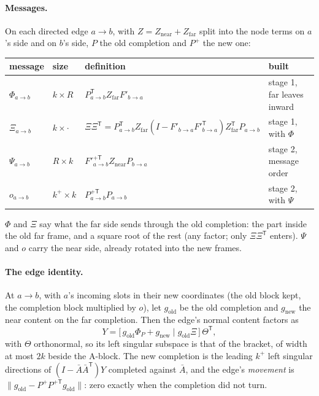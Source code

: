 \documentclass[11pt]{article}
\newcommand{\T}{\mathsf{T}}
\newcommand{\Abar}{\bar A}
\theoremstyle{definition}
\theoremstyle{plain}
\begin{document}
\paragraph{Messages.} On each directed edge $a\to b$, with $Z=Z_{\mathrm{near}}+Z_{\mathrm{far}}$ split into the
node terms on $a$'s side and on $b$'s side, $P$ the old completion and $P^+$ the new one:
\begin{center}
\begin{tabular}{@{}llll@{}}
\toprule
message & size & definition & built \\
\midrule
$\Phi_{a\to b}$ & $k\times R$ & $P_{a\to b}^\T Z_{\mathrm{far}}F'_{b\to a}$ & stage 1, far leaves inward\\
$\Xi_{a\to b}$ & $k\times\cdot$ & $\Xi\Xi^\T=P_{a\to b}^\T Z_{\mathrm{far}}(I-F'_{b\to a}F'^\T_{b\to a})Z_{\mathrm{far}}^\T P_{a\to b}$ & stage 1, with $\Phi$\\
$\Psi_{a\to b}$ & $R\times k$ & $F'^{+\T}_{a\to b}Z_{\mathrm{near}}P_{b\to a}$ & stage 2, message order\\
$o_{a\to b}$ & $k^+\times k$ & $P^{+\T}_{a\to b}P_{a\to b}$ & stage 2, with $\Psi$\\
\bottomrule
\end{tabular}
\end{center}
$\Phi$ and $\Xi$ say what the far side sends through the old completion: the part inside the old far frame, and a
square root of the rest (any factor; only $\Xi\Xi^\T$ enters). $\Psi$ and $o$ carry the near side, already rotated into
the new frames.

\paragraph{The edge identity.} At $a\to b$, with $a$'s incoming slots in their new coordinates (the old block kept,
the completion block multiplied by $o$), let $g_{\mathrm{old}}$ be the old completion and $g_{\mathrm{new}}$ the near
content on the far completion. Then the edge's normal content factors as
\begin{equation}\label{eq:edge}
  Y=\bigl[\,g_{\mathrm{old}}\Phi_P+g_{\mathrm{new}}\;\big|\;g_{\mathrm{old}}\Xi\,\bigr]\,\Theta^\T ,
\end{equation}
with $\Theta$ orthonormal, so its left singular subspace is that of the bracket, of width at most $2k$ beside the
A-block. The new completion is the leading $k^+$ left singular directions of $(I-\Abar\Abar^\T)Y$ completed against
$\Abar$, and the edge's \emph{movement} is $\|g_{\mathrm{old}}-P^+P^{+\T}g_{\mathrm{old}}\|$: zero exactly when the
completion did not turn.
\end{document}
